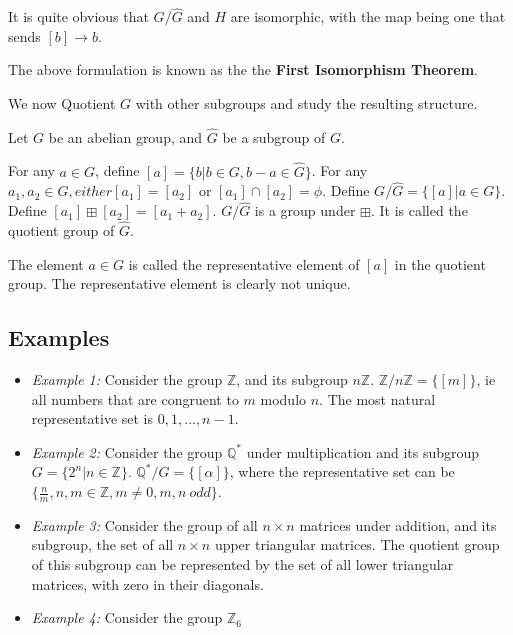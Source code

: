 It is quite obvious that $G \big/ \widehat{G}$ and $H$ are isomorphic, with the map being one that sends $[b] \rightarrow b$.
\par
The above formulation is known as the the \textbf{First Isomorphism Theorem}.
\par
We now Quotient $G$ with other subgroups and study the resulting structure.
\par
Let $G$ be an abelian group, and $\widehat{G}$ be a subgroup of $G$.
\par
For any $a \in G$, define $[a] = \{ b | b \in G, b - a \in \widehat{G} \}$.
For any $a_{1}, a_{2} \in G, either [a_{1}] = [a_{2}]$ or $[a_{1}] \cap [a_{2}] = \phi$.
Define $G \Big/ \widehat{G} = \{ [a] | a \in G \}$.
Define $[a_{1}] \boxplus [a_{2}] = [a_{1} + a_{2}]$.
$G \Big/ \widehat{G}$ is a group under $\boxplus$.
It is called the quotient group of $\widehat{G}$.
\par
The element $a \in G$ is called the representative element of $[a]$ in the quotient group.
The representative element is clearly not unique.
\subsection{Examples}
\begin{itemize}
  \item \emph{Example 1:} Consider the group $\mathbb{Z}$, and its subgroup $n \mathbb{Z}$. $\mathbb{Z} \Big/ n \mathbb{Z} = \{ [m] \}$, ie all numbers that are congruent to $m$ modulo $n$.
    The most natural representative set is ${0, 1, \dots , n-1}$.
  \item \emph{Example 2:} Consider the group $\mathbb{Q}^{*}$ under multiplication and its subgroup $G = \{ 2^{n} | n \in \mathbb{Z} \}$.
    $\mathbb{Q}^{*} \Big/ G = \{ [\alpha] \}$, where the representative set can be $ \{ \frac{n}{m} , n, m \in \mathbb{Z} , m \neq 0, m, n \ odd \}$.
  \item \emph{Example 3:} Consider the group of all $n \times n$ matrices under addition, and its subgroup, the set of all $n \times n$ upper triangular matrices.
    The quotient group of this subgroup can be represented by the set of all lower triangular matrices, with zero in their diagonals.
  \item \emph{Example 4:} Consider the group $\mathbb{Z}_{6}$
\end{itemize}
